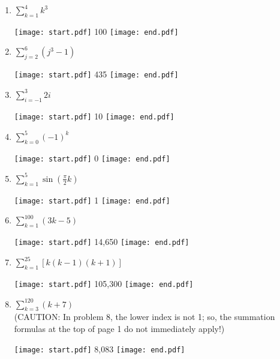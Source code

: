 \documentclass[12pt]{article}
\begin{document}
\begin{enumerate}

\item $\sum\limits_{k=1}^{4}k^3$ 

\texttt{[image: start.pdf]}
{{100}}
\texttt{[image: end.pdf]}


\item $\sum\limits_{j=2}^{6} (j^3-1)$ 

\texttt{[image: start.pdf]}
{{435}}
\texttt{[image: end.pdf]}


\item $\sum_{i=-1}^3{2i}$

\texttt{[image: start.pdf]}
{{10}}
\texttt{[image: end.pdf]}


\item $\sum_{k=0}^5{(-1)^k}$

\texttt{[image: start.pdf]}
{{0}}
\texttt{[image: end.pdf]}


\item $\sum_{k=1}^5{\sin{\left(\frac{\pi}{2}k\right)}}$

\texttt{[image: start.pdf]}
{{1}}
\texttt{[image: end.pdf]}


\end{enumerate}


\begin{enumerate}
\setcounter{enumi}{5}

\item $\sum_{k=1}^{100}{(3k-5)}$

\texttt{[image: start.pdf]}
{{14,650}}
\texttt{[image: end.pdf]}


\item $\sum\limits_{k=1}^{25}[ k(k-1)(k+1)]$ 

\texttt{[image: start.pdf]}
{{105,300}}
\texttt{[image: end.pdf]}


\item $\sum_{k=3}^{120}{(k+7)}$\\

(CAUTION: In problem 8, the lower index is not 1; so, the summation formulas at the top of page 1 do not immediately apply!)

\texttt{[image: start.pdf]}
{{8,083}}
\texttt{[image: end.pdf]}


\end{enumerate}

\end{document}
